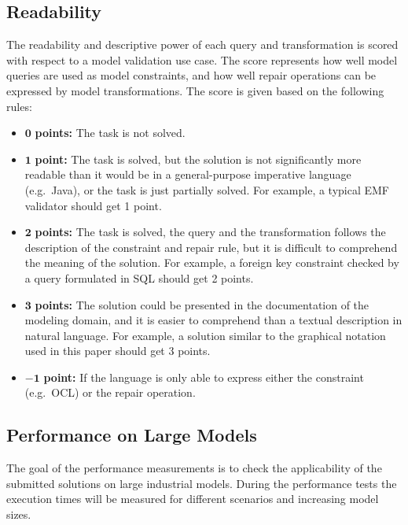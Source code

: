 \documentclass[submission,copyright,creativecommons]{eptcs}
\begin{document}
\noindent{}

\subsection{Readability}

The readability and descriptive power of each query and transformation is scored with respect to a model validation use case. The score represents how well model queries are used as model constraints, and how well repair operations can be expressed by model transformations. The score is given based on the following rules:
\begin{itemize}
  \item $\mathbf{0}$   \textbf{points:} The task is not solved.
  \item $\mathbf{1}$   \textbf{point:} The task is solved, but the solution is not significantly more readable than it would be in a general-purpose imperative language (e.g.\ Java), or the task is just partially solved. For example, a typical EMF validator should get 1 point.
  \item $\mathbf{2}$   \textbf{points:} The task is solved, the query and the transformation follows the description of the constraint and repair rule, but it is difficult to comprehend the meaning of the solution. For example, a foreign key constraint checked by a query formulated in SQL should get 2 points.
  \item $\mathbf{3}$   \textbf{points:} The solution could be presented in the documentation of the modeling domain, and it is easier to comprehend than a textual description in natural language. For example, a solution similar to the graphical notation used in this paper should get 3 points.
  \item $\mathbf{-1}$  \textbf{point:} If the language is only able to express either the constraint (e.g.\ OCL) or the repair operation.
\end{itemize}

\noindent{}

\subsection{Performance on Large Models}
The goal of the performance measurements is to check the applicability of the submitted solutions on large industrial models. During the performance tests the execution times will be measured for different scenarios and increasing model sizes.
\end{document}
